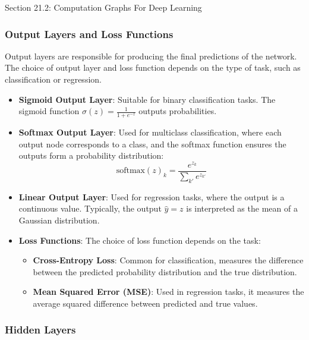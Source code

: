 \begin{notes}{Section 21.2: Computation Graphs For Deep Learning}
    \subsubsection*{Output Layers and Loss Functions}
    
    Output layers are responsible for producing the final predictions of the network. The choice of output layer and loss function depends on the type of task, such as classification or regression.
    
    \begin{highlight}
    
        \begin{itemize}
            \item \textbf{Sigmoid Output Layer}: Suitable for binary classification tasks. The sigmoid function $\sigma(z) = \frac{1}{1 + e^{-z}}$ outputs probabilities.
            \item \textbf{Softmax Output Layer}: Used for multiclass classification, where each output node corresponds to a class, and the softmax function ensures the outputs form a probability distribution:
            \[
            \text{softmax}(z)_k = \frac{e^{z_k}}{\sum_{k'} e^{z_{k'}}}
            \]
            \item \textbf{Linear Output Layer}: Used for regression tasks, where the output is a continuous value. Typically, the output $\hat{y} = z$ is interpreted as the mean of a Gaussian distribution.
            \item \textbf{Loss Functions}: The choice of loss function depends on the task:
            \begin{itemize}
                \item \textbf{Cross-Entropy Loss}: Common for classification, measures the difference between the predicted probability distribution and the true distribution.
                \item \textbf{Mean Squared Error (MSE)}: Used in regression tasks, it measures the average squared difference between predicted and true values.
            \end{itemize}
        \end{itemize}
    
    \end{highlight}
    
    \subsubsection*{Hidden Layers}
    

\end{notes}
